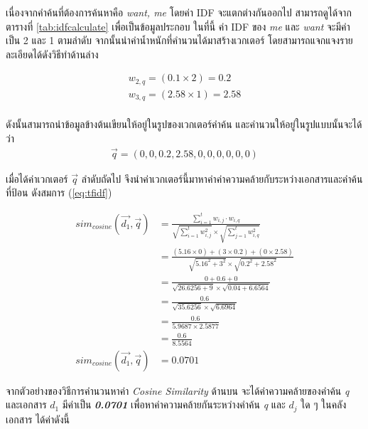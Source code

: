 \documentclass[11pt,a4paper]{article}
\begin{document}
{{{เนื่องจากคำค้นที่ต้องการค้นหาคือ \emph{want, me} โดยค่า IDF จะแตกต่างกันออกไป สามารถดูได้จากตารางที่ \ref{tab:idfcalculate} เพื่อเป็นข้อมูลประกอบ ในที่นี้ ค่า IDF ของ \emph{me} และ \emph{want} จะมีค่าเป็น 2 และ 1 ตามลำดับ จากนั้นนำค่าน้ำหนักที่คำนวนได้มาสร้างเวกเตอร์ โดยสามารถแจกแจงรายละเอียดได้ดังวิธีทำด้านล่าง

\begin{align*}
   w_{2,q} = (0.1  \times 2) = 0.2 \\
   w_{3,q} = (2.58 \times 1) = 2.58 \\
\end{align*}

ดังนั้นสามารถนำข้อมูลข้างต้นเขียนให้อยู่ในรูปของเวกเตอร์คำค้น และคำนวนให้อยู่ในรูปแบบนั้นจะได้ว่า 
\begin{align*}
    \overrightarrow{q} = (0, 0, 0.2, 2.58, 0, 0, 0, 0, 0, 0)
\end{align*}

เมื่อได้ค่าเวกเตอร์ $\overrightarrow{q}$ ลำดับถัดไป จึงนำค่าเวกเตอร์นี้มาหาค่าค่าความคล้ายกับระหว่างเอกสารและคำค้นที่ป้อน ดังสมการ ({\ref{eq:tfidf}}) 

\begin{align*}
    sim_{cosine}(\overrightarrow{d_{1}}, \overrightarrow{q}) & = \frac{\sum_{i=1}^{t} w_{i,j} \cdot w_{i,q}}{\sqrt{\sum_{i=1}^{t} w_{i,j}^2} \times \sqrt{\sum_{j=1}^{t} w_{i,q}^2}} \\
    &= \frac{(5.16 \times 0) + (3 \times 0.2) + (0 \times 2.58)}{\sqrt{5.16^{2} + 3^2} \times \sqrt{0.2^2 + 2.58^2}} \\
    &= \frac{0 + 0.6 + 0}{\sqrt{26.6256 + 9} \times \sqrt{0.04 + 6.6564}} \\
    &= \frac{0.6}{\sqrt{35.6256} \times \sqrt{6.6964}} \\
    &= \frac{0.6}{5.9687 \times 2.5877} \\
    &= \frac{0.6}{8.5564} \\
    sim_{cosine}(\overrightarrow{d_{1}}, \overrightarrow{q}) &= 0.0701 
\end{align*}

จากตัวอย่างของวิธีการคำนวนหาค่า \emph{Cosine Similarity} ด้านบน จะได้ค่าความคล้ายของคำค้น \emph{q} 
และเอกสาร \emph{$d_{1}$} มีค่าเป็น {\bf \emph{0.0701}} เพื่อหาค่าความคล้ายกันระหว่างคำค้น \emph{q} และ \emph{$d_{j}$} ใด ๆ ในคลังเอกสาร ได้ค่าดังนี้

}}}
\end{document}
